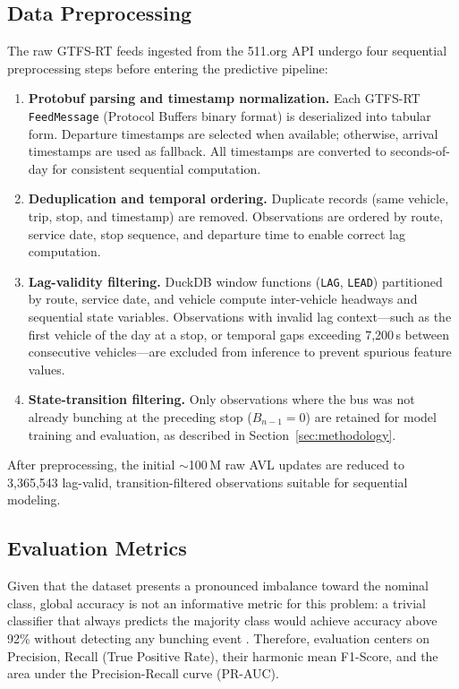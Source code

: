 \documentclass[fleqn,10pt,lineno]{wlpeerj}
\begin{document}
\subsection{Data Preprocessing}

The raw GTFS-RT feeds ingested from the 511.org API undergo four sequential preprocessing steps
before entering the predictive pipeline:
\begin{enumerate}
  \item \textbf{Protobuf parsing and timestamp normalization.} Each GTFS-RT
    \texttt{FeedMessage} (Protocol Buffers binary format) is deserialized into tabular form.
    Departure timestamps are selected when available; otherwise, arrival timestamps are used as
    fallback. All timestamps are converted to seconds-of-day for consistent sequential
    computation.
  \item \textbf{Deduplication and temporal ordering.} Duplicate records (same vehicle, trip,
    stop, and timestamp) are removed. Observations are ordered by route, service date, stop
    sequence, and departure time to enable correct lag computation.
  \item \textbf{Lag-validity filtering.} DuckDB window functions (\texttt{LAG}, \texttt{LEAD})
    partitioned by route, service date, and vehicle compute inter-vehicle headways and sequential
    state variables. Observations with invalid lag context---such as the first vehicle of the day
    at a stop, or temporal gaps exceeding 7{,}200\,s between consecutive vehicles---are excluded
    from inference to prevent spurious feature values.
  \item \textbf{State-transition filtering.} Only observations where the bus was not already
    bunching at the preceding stop ($B_{n-1}=0$) are retained for model training and evaluation,
    as described in Section~\ref{sec:methodology}.
\end{enumerate}
After preprocessing, the initial ${\sim}$100\,M raw AVL updates are reduced to 3,365,543
lag-valid, transition-filtered observations suitable for sequential modeling.

\subsection{Evaluation Metrics}

Given that the dataset presents a pronounced imbalance toward the nominal class, global accuracy
is not an informative metric for this problem: a trivial classifier that always predicts the
majority class would achieve accuracy above 92\% without detecting any bunching event
\citep{17}. Therefore, evaluation centers on Precision, Recall (True Positive Rate), their
harmonic mean F1-Score, and the area under the Precision-Recall curve (PR-AUC).
\end{document}
